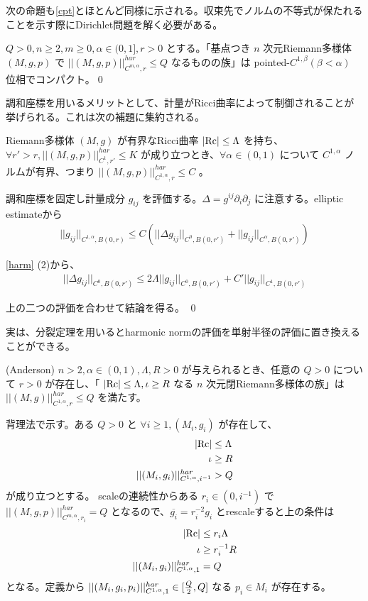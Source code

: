 \documentclass[dvipdfmx,a4paper]{jsarticle}
\theoremstyle{definition}
\newcommand{\der}{\partial}
\renewcommand{\bar}{\overline}
\newcommand{\Rc}{{\rm Rc}}
\begin{document}
次の命題も\ref{cpt}とほとんど同様に示される。収束先でノルムの不等式が保たれることを示す際にDirichlet問題を解く必要がある。

\prop  $Q>0,n \geq 2,m \geq 0,\alpha \in (0,1],r>0$ とする。「基点つき $n$ 次元Riemann多様体 $(M,g,p)$ で $||(M,g,p)||^{har}_{C^{m,\alpha},r} \leq Q$ なるものの族」は pointed-$C^{1,\beta} (\beta<\alpha)$ 位相でコンパクト。\qed

調和座標を用いるメリットとして、計量がRicci曲率によって制御されることが挙げられる。これは次の補題に集約される。

\lem Riemann多様体 $(M,g)$ が有界なRicci曲率 $|\Rc| \leq \Lambda$ を持ち、$\forall r'>r,||(M,g,p)||^{har}_{C^1,r'} \leq K$ が成り立つとき、$\forall \alpha \in (0,1)$ について $C^{1,\alpha}$ ノルムが有界、つまり  $||(M,g,p)||^{har}_{C^{1,\alpha},r} \leq C$ 。

\prf 調和座標を固定し計量成分 $g_{ij}$ を評価する。$\Delta=g^{ij}\der_i \der_j$ に注意する。elliptic estimateから
\begin{align*}
    ||g_{ij}||_{C^{1,\alpha},B(0,r)} \leq C(||\Delta g_{ij}||_{C^0,B(0,r')}+||g_{ij}||_{C^\alpha,B(0,r')})
\end{align*}

\ref{harm} (2)から、
\begin{align*}
    ||\Delta g_{ij}||_{C^0,B(0,r')} \leq 2\Lambda||g_{ij}||_{C^0,B(0,r')}+C'||g_{ij}||_{C^1,B(0,r')}
\end{align*}

上の二つの評価を合わせて結論を得る。 \qed

実は、分裂定理を用いるとharmonic normの評価を単射半径の評価に置き換えることができる。

\thm (Anderson) $n>2,\alpha \in (0,1),\Lambda ,R>0$ が与えられるとき、任意の $Q>0$ について $r>0$ が存在し、「 $|\Rc| \leq \Lambda,\iota \geq R$ なる $n$ 次元閉Riemann多様体の族」は $||(M,g)||^{har}_{C^{1,\alpha},r} \leq Q$ を満たす。

\prf 背理法で示す。ある $Q>0$ と $\forall i \geq 1,(M_i,g_i)$ が存在して、
\begin{align*}
    |\Rc| &\leq \Lambda \\
    \iota &\geq R \\
    ||(M_i,g_i)||^{har}_{C^{1,\alpha},i^{-1}} &> Q
\end{align*}
が成り立つとする。
scaleの連続性からある $r_i \in (0,i^{-1})$ で $||(M,g,p)||^{har}_{C^{m,\alpha},r_i} = Q$ となるので、$\bar{g_i}=r_i^{-2}g_i$ とrescaleすると上の条件は
\begin{align*}
    |\Rc| &\leq r_i\Lambda \\
    \iota &\geq r_i^{-1}R \\
    ||(M_i,g_i)||^{har}_{C^{1,\alpha},1} &= Q
\end{align*}
となる。定義から $||(M_i,g_i,p_i)||^{har}_{C^{1,\alpha},1} \in [{Q \over 2},Q]$ なる $p_i \in M_i$ が存在する。
\end{document}
